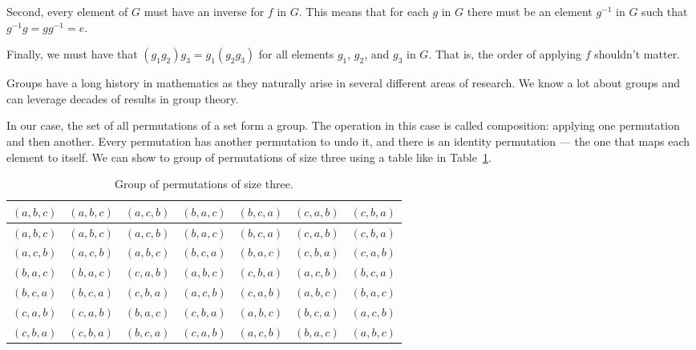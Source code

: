 \documentclass{iansnotes}
\begin{document}
  Second, every element of $G$ must have an inverse for $f$ in $G$.
  This means that for each $g$ in $G$ there must be an element $g^{-1}$ in $G$ such that $g^{-1}g = gg^{-1} = e$.

  Finally, we must have that $(g_1 g_2)g_3 = g_1 (g_2 g_3)$ for all elements $g_1$, $g_2$, and $g_3$ in $G$.
  That is, the order of applying $f$ shouldn't matter.

  Groups have a long history in mathematics as they naturally arise in several different areas of research.
  We know a lot about groups and can leverage decades of results in group theory.

  In our case, the set of all permutations of a set form a group.
  The operation in this case is called composition: applying one permutation and then another.
  Every permutation has another permutation to undo it, and there is an identity permutation --- the one that maps each element to itself.
  We can show to group of permutations of size three using a table like in Table~\ref{table:group}.
  
  \begin{table}
    \centering
    \begin{tabular}{c|cccccc}
      $(a,b,c)$ & $(a,b,c)$ & $(a,c,b)$ & $(b,a,c)$ & $(b,c,a)$ & $(c,a,b)$ & $(c,b,a)$ \\
      \midrule
      $(a,b,c)$ & $(a,b,c)$ & $(a,c,b)$ & $(b,a,c)$ & $(b,c,a)$ & $(c,a,b)$ & $(c,b,a)$ \\
      $(a,c,b)$ & $(a,c,b)$ & $(a,b,c)$ & $(b,c,a)$ & $(b,a,c)$ & $(c,b,a)$ & $(c,a,b)$ \\
      $(b,a,c)$ & $(b,a,c)$ & $(c,a,b)$ & $(a,b,c)$ & $(c,b,a)$ & $(a,c,b)$ & $(b,c,a)$ \\
      $(b,c,a)$ & $(b,c,a)$ & $(c,b,a)$ & $(a,c,b)$ & $(c,a,b)$ & $(a,b,c)$ & $(b,a,c)$ \\
      $(c,a,b)$ & $(c,a,b)$ & $(b,a,c)$ & $(c,b,a)$ & $(a,b,c)$ & $(b,c,a)$ & $(a,c,b)$ \\
      $(c,b,a)$ & $(c,b,a)$ & $(b,c,a)$ & $(c,a,b)$ & $(a,c,b)$ & $(b,a,c)$ & $(a,b,c)$ \\
    \end{tabular}
    \caption{Group of permutations of size three.}
    \label{table:group}
  \end{table}
  \vspace{4mm}
\end{document}
